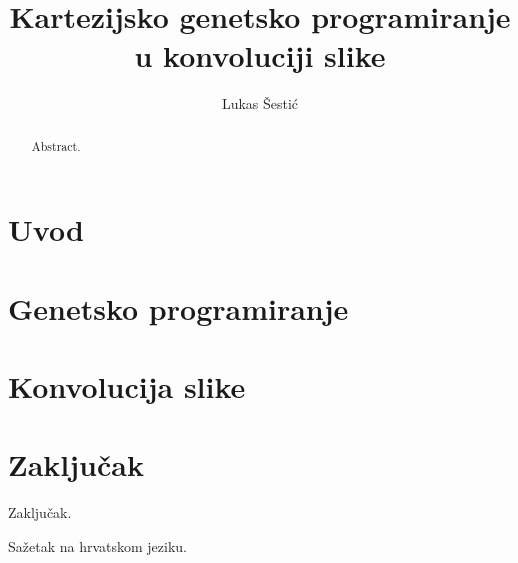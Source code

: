 \documentclass[times, utf8, diplomski]{fer}
\begin{document}
\title{Kartezijsko genetsko programiranje u konvoluciji slike}
\author{Lukas Šestić}

\maketitle

\izvornik

\zahvala{}

\tableofcontents

\chapter{Uvod}


\chapter{Genetsko programiranje}


\chapter{Konvolucija slike}


\chapter{Zaključak}
Zaključak.




\begin{sazetak}
Sažetak na hrvatskom jeziku.

\end{sazetak}

\begin{abstract}
Abstract.

\end{abstract}
\end{document}
